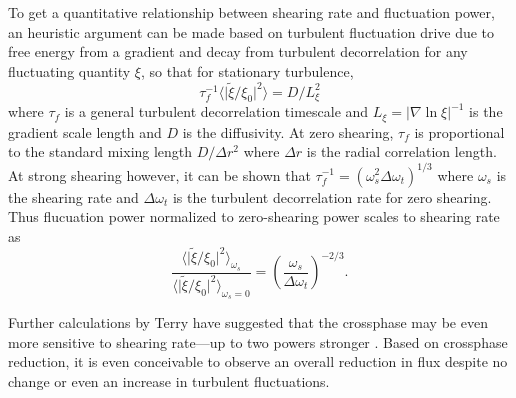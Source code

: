 \documentclass[%
 aip,
 amsmath,amssymb,
 preprint,%
]{revtex4-1}
\begin{document}
To get a quantitative relationship between shearing rate and fluctuation power, an heuristic argument can be made \cite{biglari90} based on turbulent fluctuation drive due to free energy from a gradient and decay from turbulent decorrelation for any fluctuating quantity $\xi$, so that for stationary turbulence,
\begin{equation}
\tau_{f}^{-1} \langle \lvert \tilde{\xi}/\xi_{0} \rvert ^{2} \rangle = D/L_{\xi}^{2}
\label{eq:flucsbalance}
\end{equation}
where $\tau_{f}$ is a general turbulent decorrelation timescale and $L_{\xi} = \lvert \nabla \ln \xi \rvert ^{-1}$ is the gradient scale length and $D$ is the diffusivity. At zero shearing, $\tau_{f}$ is proportional to the standard mixing length $D/\Delta r^{2}$ where $\Delta r$ is the radial correlation length. At strong shearing however, it can be shown that $\tau_{f}^{-1} = (\omega_{s}^{2} \Delta \omega_{t})^{1/3}$ where $\omega_{s}$ is the shearing rate and $\Delta \omega_{t}$ is the turbulent decorrelation rate for zero shearing. Thus flucuation power normalized to zero-shearing power scales to shearing rate as
\begin{equation}
\frac{\langle \lvert \tilde{\xi}/\xi_{0} \rvert ^{2} \rangle _{\omega_{s}}}{\langle \lvert \tilde{\xi}/\xi_{0} \rvert ^{2} \rangle _{\omega_{s}=0}} = \left(\frac{\omega_{s}}{{\Delta \omega_{t}}}\right)^{-2/3}.
\label{eq:flucsvsshear}
\end{equation}

Further calculations by Terry have suggested that the crossphase may be even more sensitive to shearing rate---up to two powers stronger \cite{terry01}. Based on crossphase reduction, it is even conceivable to observe an overall reduction in flux despite no change or even an increase in turbulent fluctuations.
\end{document}

